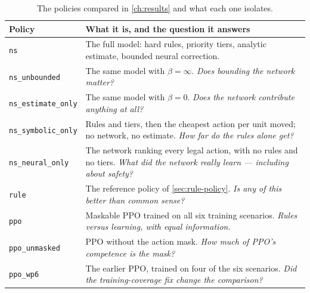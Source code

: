 \begin{table}[H]
    \centering
    \caption{The policies compared in \cref{ch:results} and what each one isolates.}
    \label{tab:policies}
    \begin{tabularx}{\textwidth}{lX}
        \toprule
        Policy & What it is, and the question it answers\\
        \midrule
        \texttt{ns} & The full model: hard rules, priority tiers, analytic estimate, bounded neural correction.\\
        \texttt{ns\_unbounded} & The same model with $\beta=\infty$. \emph{Does bounding the network matter?}\\
        \texttt{ns\_estimate\_only} & The same model with $\beta=0$. \emph{Does the network contribute anything at all?}\\
        \texttt{ns\_symbolic\_only} & Rules and tiers, then the cheapest action per unit moved; no network, no estimate. \emph{How far do the rules alone get?}\\
        \texttt{ns\_neural\_only} & The network ranking every legal action, with no rules and no tiers. \emph{What did the network really learn --- including about safety?}\\
        \texttt{rule} & The reference policy of \cref{sec:rule-policy}. \emph{Is any of this better than common sense?}\\
        \texttt{ppo} & Maskable PPO trained on all six training scenarios. \emph{Rules versus learning, with equal information.}\\
        \texttt{ppo\_unmasked} & PPO without the action mask. \emph{How much of PPO's competence is the mask?}\\
        \texttt{ppo\_wp6} & The earlier PPO, trained on four of the six scenarios. \emph{Did the training-coverage fix change the comparison?}\\
        \bottomrule
    \end{tabularx}
\end{table}
